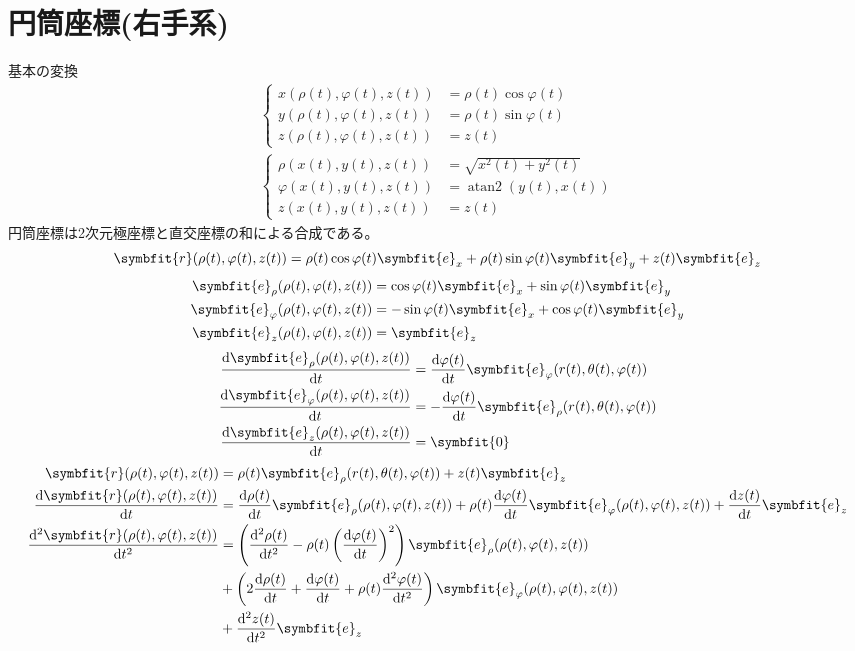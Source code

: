 \documentclass[12pt,oneside]{jlreq}
\DeclareMathOperator{\atantwo}{atan2}
\newcommand{\bm}[1]{\symbfit{#1}}
\begin{document}
\section{円筒座標(右手系)}
基本の変換
\begin{gather*}
    \left\{
        \begin{aligned}
            x(\rho(t),\varphi(t),z(t))&=\rho(t)\cos\varphi(t)\\
            y(\rho(t),\varphi(t),z(t))&=\rho(t)\sin\varphi(t)\\
            z(\rho(t),\varphi(t),z(t))&=z(t)
        \end{aligned}
    \right.\\
    \left\{
        \begin{aligned}
            \rho(x(t),y(t),z(t))&=\sqrt{x^2(t)+y^2(t)}\\
            \varphi(x(t),y(t),z(t))&=\atantwo(y(t),x(t))\\
            z(x(t),y(t),z(t))&=z(t)
        \end{aligned}
    \right.
\end{gather*}
円筒座標は2次元極座標と直交座標の和による合成である。
\[
\bm{r}(\rho(t),\varphi(t),z(t))=\rho(t)\cos\varphi(t)\bm{e}_x+\rho(t)\sin\varphi(t)\bm{e}_y+z(t)\bm{e}_z
\]
\begin{align*}
    \bm{e}_{\rho}(\rho(t),\varphi(t),z(t))&=\cos\varphi(t)\bm{e}_x+\sin\varphi(t)\bm{e}_y\\
    \bm{e}_{\varphi}(\rho(t),\varphi(t),z(t))&=-\sin\varphi(t)\bm{e}_x+\cos\varphi(t)\bm{e}_y\\
    \bm{e}_{z}(\rho(t),\varphi(t),z(t))&=\bm{e}_z
\end{align*}
\begin{align*}
    \odv{\bm{e}_{\rho}(\rho(t),\varphi(t),z(t))}{t}&=\odv{\varphi(t)}{t}\bm{e}_{\varphi}(r(t),\theta(t),\varphi(t))\\
    \odv{\bm{e}_{\varphi}(\rho(t),\varphi(t),z(t))}{t}&=-\odv{\varphi(t)}{t}\bm{e}_{\rho}(r(t),\theta(t),\varphi(t))\\
    \odv{\bm{e}_{z}(\rho(t),\varphi(t),z(t))}{t}&=\bm{0}
\end{align*}
\begin{align*}
    \bm{r}(\rho(t),\varphi(t),z(t))&=\rho(t)\bm{e}_{\rho}(r(t),\theta(t),\varphi(t))+z(t)\bm{e}_z\\
    \odv{\bm{r}(\rho(t),\varphi(t),z(t))}{t}&=\odv{\rho(t)}{t}\bm{e}_{\rho}(\rho(t),\varphi(t),z(t))+\rho(t)\odv{\varphi(t)}{t}\bm{e}_{\varphi}(\rho(t),\varphi(t),z(t))+\odv{z(t)}{t}\bm{e}_z\\
    \odv[2]{\bm{r}(\rho(t),\varphi(t),z(t))}{t}&=\left(\odv[2]{\rho(t)}{t}-\rho(t)\left(\odv{\varphi(t)}{t}\right)^2\right)\bm{e}_{\rho}(\rho(t),\varphi(t),z(t))\\
    &+\left(2\odv{\rho(t)}{t}+\odv{\varphi(t)}{t}+\rho(t)\odv[2]{\varphi(t)}{t}\right)\bm{e}_{\varphi}(\rho(t),\varphi(t),z(t))\\
    &+\odv[2]{z(t)}{t}\bm{e}_z
\end{align*}
\end{document}
